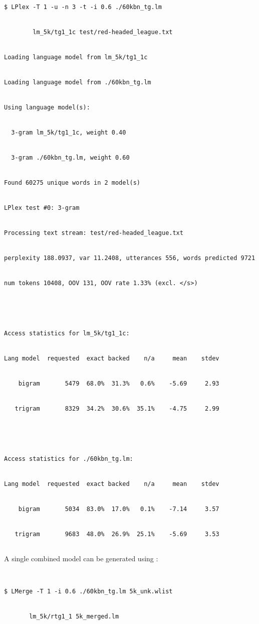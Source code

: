 \begin{verbatim}


$ LPlex -T 1 -u -n 3 -t -i 0.6 ./60kbn_tg.lm 


        lm_5k/tg1_1c test/red-headed_league.txt


Loading language model from lm_5k/tg1_1c


Loading language model from ./60kbn_tg.lm


Using language model(s): 


  3-gram lm_5k/tg1_1c, weight 0.40


  3-gram ./60kbn_tg.lm, weight 0.60


Found 60275 unique words in 2 model(s)


LPlex test #0: 3-gram


Processing text stream: test/red-headed_league.txt


perplexity 188.0937, var 11.2408, utterances 556, words predicted 9721


num tokens 10408, OOV 131, OOV rate 1.33% (excl. </s>)





Access statistics for lm_5k/tg1_1c:


Lang model  requested  exact backed    n/a     mean    stdev


    bigram       5479  68.0%  31.3%   0.6%    -5.69     2.93


   trigram       8329  34.2%  30.6%  35.1%    -4.75     2.99





Access statistics for ./60kbn_tg.lm:


Lang model  requested  exact backed    n/a     mean    stdev


    bigram       5034  83.0%  17.0%   0.1%    -7.14     3.57


   trigram       9683  48.0%  26.9%  25.1%    -5.69     3.53


\end{verbatim} %





A single combined model can be generated using :


\begin{verbatim}


$ LMerge -T 1 -i 0.6 ./60kbn_tg.lm 5k_unk.wlist 


       lm_5k/rtg1_1 5k_merged.lm


\end{verbatim} %


